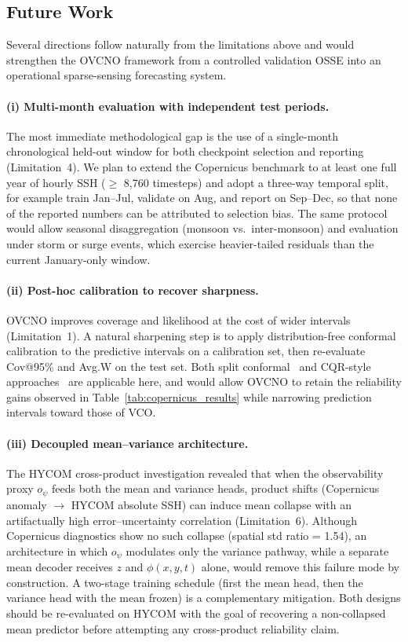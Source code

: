 \documentclass[11pt,a4paper]{article}
\begin{document}
\subsection*{Future Work}
\label{sec:future_work}

Several directions follow naturally from the limitations above and would strengthen the OVCNO framework from a controlled validation OSSE into an operational sparse-sensing forecasting system.

\paragraph{(i) Multi-month evaluation with independent test periods.}
The most immediate methodological gap is the use of a single-month chronological held-out window for both checkpoint selection and reporting (Limitation~4). We plan to extend the Copernicus benchmark to at least one full year of hourly SSH ($\geq$ 8{,}760 timesteps) and adopt a three-way temporal split, for example train Jan--Jul, validate on Aug, and report on Sep--Dec, so that none of the reported numbers can be attributed to selection bias. The same protocol would allow seasonal disaggregation (monsoon vs.\ inter-monsoon) and evaluation under storm or surge events, which exercise heavier-tailed residuals than the current January-only window.

\paragraph{(ii) Post-hoc calibration to recover sharpness.}
OVCNO improves coverage and likelihood at the cost of wider intervals (Limitation~1). A natural sharpening step is to apply distribution-free conformal calibration to the predictive intervals on a calibration set, then re-evaluate Cov@95\% and Avg.W on the test set. Both split conformal~\cite{angelopoulos2023conformal} and CQR-style approaches~\cite{romano2019cqr} are applicable here, and would allow OVCNO to retain the reliability gains observed in Table~\ref{tab:copernicus_results} while narrowing prediction intervals toward those of VCO.

\paragraph{(iii) Decoupled mean--variance architecture.}
The HYCOM cross-product investigation revealed that when the observability proxy $o_\psi$ feeds both the mean and variance heads, product shifts (Copernicus anomaly $\to$ HYCOM absolute SSH) can induce mean collapse with an artifactually high error--uncertainty correlation (Limitation~6). Although Copernicus diagnostics show no such collapse (spatial std ratio = 1.54), an architecture in which $o_\psi$ modulates only the variance pathway, while a separate mean decoder receives $z$ and $\phi(x,y,t)$ alone, would remove this failure mode by construction. A two-stage training schedule (first the mean head, then the variance head with the mean frozen) is a complementary mitigation. Both designs should be re-evaluated on HYCOM with the goal of recovering a non-collapsed mean predictor before attempting any cross-product reliability claim.
\end{document}
